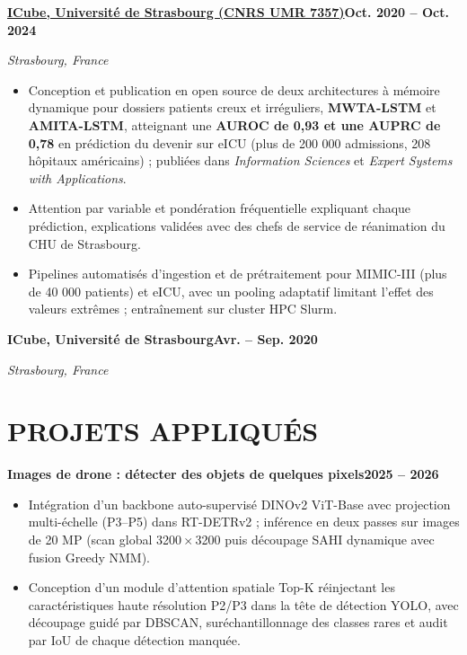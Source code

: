 \documentclass[10pt,a4paper]{article}
\newenvironment{cvitems}{\begin{itemize}[leftmargin=11pt,itemsep=0.5pt,topsep=1pt,parsep=0pt,label={\color{accent}\scriptsize$\blacktriangleright$}]\small}{\end{itemize}\vspace{2pt}}
\newcommand{\cvjob}[4]{%
  \noindent\textbf{#1}\hfill{\small\bfseries\textcolor{accent}{#2}}\par
  \noindent{\small\itshape\textcolor{muted}{#3}}\hfill{\small\itshape\textcolor{muted}{#4}}\par}
\newcommand{\cvproject}[3]{%
  \noindent\textbf{#1}\hfill{\small\bfseries\textcolor{accent}{#2}}\par
  \noindent{\footnotesize\textcolor{muted}{#3}}\par}
\begin{document}
\cvjob{\href{https://icube.unistra.fr}{ICube, Université de Strasbourg (CNRS UMR 7357)}}{Oct. 2020 – Oct. 2024}{Doctorant, réseaux profonds temporels pour trajectoires irrégulières en réanimation}{Strasbourg, France}
\begin{cvitems}
  \item Conception et publication en open source de deux architectures à mémoire dynamique pour dossiers patients creux et irréguliers, \textbf{MWTA-LSTM} et \textbf{AMITA-LSTM}, atteignant une \textbf{AUROC de 0,93 et une AUPRC de 0,78} en prédiction du devenir sur eICU (plus de 200 000 admissions, 208 hôpitaux américains) ; publiées dans \textit{Information Sciences} et \textit{Expert Systems with Applications}.
  \item Attention par variable et pondération fréquentielle expliquant chaque prédiction, explications validées avec des chefs de service de réanimation du CHU de Strasbourg.
  \item Pipelines automatisés d’ingestion et de prétraitement pour MIMIC-III (plus de 40 000 patients) et eICU, avec un pooling adaptatif limitant l’effet des valeurs extrêmes ; entraînement sur cluster HPC Slurm.
\end{cvitems}

\cvjob{ICube, Université de Strasbourg}{Avr. – Sep. 2020}{Stagiaire de recherche (Master) : détection d’anomalies interprétable (LSTM + shapelets, CAM)}{Strasbourg, France}
\vspace{4pt}

\section{PROJETS APPLIQUÉS}
\cvproject{Images de drone : détecter des objets de quelques pixels}{2025 – 2026}{RT-DETRv2, DINOv2 ViT-B, YOLO26-P2, SAHI/ASAHI, DBSCAN, Grad-CAM}
\begin{cvitems}
  \item Intégration d’un backbone auto-supervisé DINOv2 ViT-Base avec projection multi-échelle (P3–P5) dans RT-DETRv2 ; inférence en deux passes sur images de 20 MP (scan global 3200\,$\times$\,3200 puis découpage SAHI dynamique avec fusion Greedy NMM).
  \item Conception d’un module d’attention spatiale Top-K réinjectant les caractéristiques haute résolution P2/P3 dans la tête de détection YOLO, avec découpage guidé par DBSCAN, suréchantillonnage des classes rares et audit par IoU de chaque détection manquée.
\end{cvitems}
\end{document}
